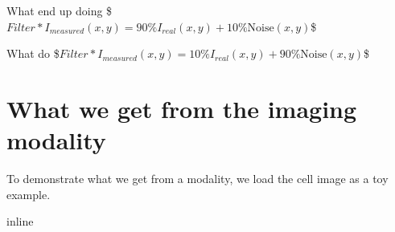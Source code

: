 \documentclass[letterpaper,10pt,english]{sphinxmanual}
\begin{document}
\sphinxAtStartPar
What  end up doing
\$\( \textit{Filter} \ast I_{measured}(x,y) = 90\%  I_{real}(x,y) + 10\% \text{Noise}(x,y) \)\$





\sphinxAtStartPar
What  do
\$\( \textit{Filter} \ast I_{measured}(x,y) = 10\% I_{real}(x,y) + 90\% \text{Noise}(x,y) \)\$




\section{What we get from the imaging modality}
\label{\detokenize{04-BasicSegmentation:what-we-get-from-the-imaging-modality}}
\sphinxAtStartPar
To demonstrate what we get from a modality, we load the cell image as a toy example.

\begin{sphinxVerbatim}[commandchars=\\\{\}]
 inline
   
   
   
\end{sphinxVerbatim}
\end{document}
